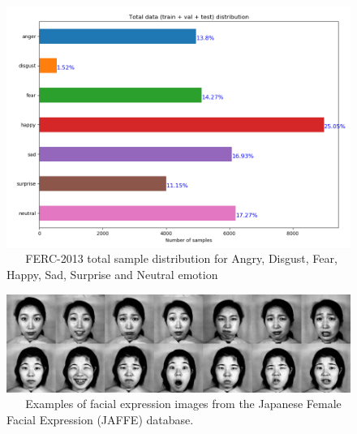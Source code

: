 \documentclass[master]{thesis-uestc}
\begin{document}
\begin{figure}[ht]
\includegraphics[width=5in]{pic/total_data_distribution.png}
\caption{\,\,\,\,\,\,\,\,\,\,FERC-2013 total sample distribution for Angry, Disgust, Fear, Happy, Sad, Surprise and Neutral emotion}
\label{fer2013_distribution}
\end{figure}

\begin{figure}[ht]
\includegraphics[width=5in]{pic/jaffe.png}
\caption{\,\,\,\,\,\,\,\,\,\,Examples of facial expression images from the Japanese Female Facial Expression (JAFFE) database.}
\label{jaffe_images}
\end{figure}
\end{document}
